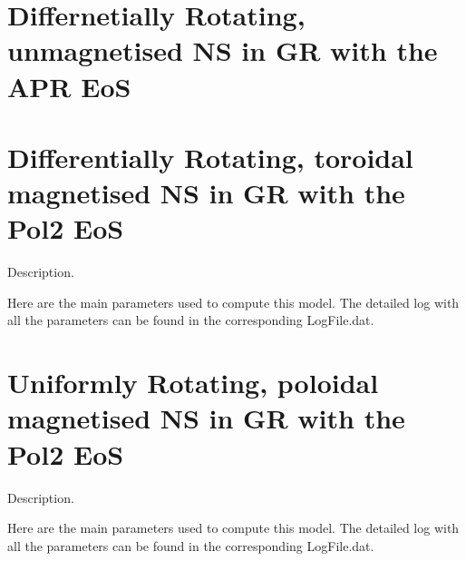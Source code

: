 \documentclass[letterpaper,10pt,english]{sphinxmanual}
\begin{document}
\section{Differnetially Rotating, unmagnetised NS in GR with the APR EoS}
\label{\detokenize{examples_gr:differnetially-rotating-unmagnetised-ns-in-gr-with-the-apr-eos}}
\begin{sphinxVerbatim}[commandchars=\\\{\}]
            
\end{sphinxVerbatim}


\section{Differentially Rotating, toroidal magnetised NS in GR with the Pol2 EoS}
\label{\detokenize{examples_gr:differentially-rotating-toroidal-magnetised-ns-in-gr-with-the-pol2-eos}}
\sphinxAtStartPar
Description.

\sphinxAtStartPar
Here are the main parameters used to compute this model. The detailed log with all the parameters can be found in the corresponding LogFile.dat.

\begin{sphinxVerbatim}[commandchars=\\\{\}]
            
\end{sphinxVerbatim}


\section{Uniformly Rotating, poloidal magnetised NS in GR with the Pol2 EoS}
\label{\detokenize{examples_gr:uniformly-rotating-poloidal-magnetised-ns-in-gr-with-the-pol2-eos}}
\sphinxAtStartPar
Description.

\sphinxAtStartPar
Here are the main parameters used to compute this model. The detailed log with all the parameters can be found in the corresponding LogFile.dat.

\begin{sphinxVerbatim}[commandchars=\\\{\}]
            
\end{sphinxVerbatim}
\end{document}
